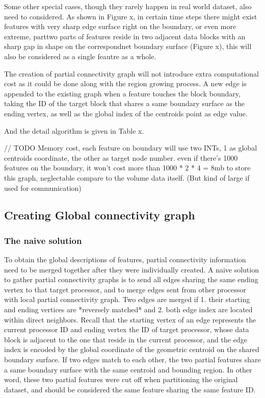 \documentclass[10pt, conference, compsocconf]{IEEEtran}
\begin{document}
Some other special cases, though they rarely happen in real world dataset, also need to considered. As shown in Figure x, in certain time steps there might exist features with very sharp edge surface right on the boundary, or even more extreme, parttwo parts of features reside in two adjacent data blocks with an sharp gap in shape on the correspondnet boundary surface (Figure x), this will also be considered as a single feautre as a whole.

The creation of partial connectivity graph will not introduce extra computational cost as it could be done along with the region growing process. A new edge is appended to the existing graph when a feature touches the block boundary, taking the ID of the target block that shares a same boundary surface as the ending vertex, as well as the global index of the centroids point as edge value.


And the detail algorithm is given in Table x.

// TODO
Memory cost, each feature on boundary will use two INTs, 1 as global centroids coordinate, the other as target node number. even if there's 1000 features on the boundary, it won’t cost more than 1000 * 2 * 4 = 8mb to store this graph, neglectable compare to the volume data itself. (But kind of large if used for communication)

\subsection{Creating Global connectivity graph}

\subsubsection{The naive solution}
To obtain the global descriptions of features, partial connectivity information need to be merged together after they were individually created. A naive solution to gather partial connectivity graphs is to send all edges sharing the same ending vertex to that target processor, and to merge edges sent from other processor with local partial connectivity graph. Two edges are merged if 1. their starting and ending vertices are *reversely matched* and 2. both edge index are located within direct neighbors. Recall that the starting vertex of an edge represents the current processor ID and ending vertex the ID of target processor, whose data block is adjacent to the one that reside in the current processor, and the edge index is encoded by the global coordinate of the geometric centroid on the shared boundary surface. If two edges match to each other, the two partial features share a same boundary surface with the same centroid and bounding region. In other word, these two partial features were cut off when partitioning the original dataset, and should be considered the same feature sharing the same feature ID.
\end{document}
